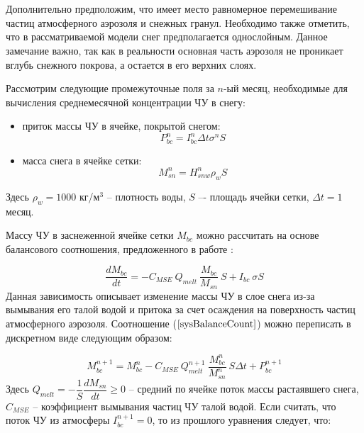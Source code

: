 \documentclass[a4paper, fontsize=14pt]{scrartcl}
\begin{document}
\\~

Дополнительно предположим, что имеет место равномерное перемешивание частиц атмосферного аэрозоля и снежных гранул. Необходимо также отметить, что в рассматриваемой модели снег предполагается однослойным. Данное замечание важно, так как в реальности основная часть аэрозоля не проникает вглубь снежного покрова, а остается в его верхних слоях.

\newpage
Рассмотрим следующие промежуточные поля за $n$-ый месяц, необходимые для вычисления среднемесячной концентрации ЧУ в снегу: 
\begin{itemize}
    \item приток массы ЧУ в ячейке, покрытой снегом:
    \begin{equation}
        P_{bc}^n = I_{bc}^n \Delta t \sigma^n S   \label{sys}
    \end{equation}
    \item масса снега в ячейке сетки:
    \begin{equation}
        M_{sn}^n = H_{snw}^n \rho_w S   \label{sys}
    \end{equation}
\end{itemize} 
Здесь $\rho_w = 1000$ кг/м$^3$ -- плотность воды, $S$ –- площадь ячейки сетки, $\Delta t = 1$ месяц.
    
Массу ЧУ в заснеженной ячейке сетки $M_{bc}$ можно рассчитать на основе балансового соотношения, предложенного в работе \cite{Flanner2007}:

\begin{equation}
    \dfrac{d M_{bc}}{d t} = - C_{MSE} ~ Q_{melt} ~ \dfrac{M_{bc}}{M_{sn}} ~ S + I_{bc} ~ \sigma S     \label{sysBalanceCount}
\end{equation}
Данная зависимость описывает изменение массы ЧУ в слое снега из-за вымывания его талой водой и притока за счет осаждения на поверхность частиц атмосферного аэрозоля. Соотношение ($\ref{sysBalanceCount}$) можно переписать в дискретном виде следующим образом:

\begin{equation}
   M_{bc}^{n+1} = M_{bc}^n - C_{MSE} ~ Q_{melt}^{n+1} ~ \dfrac{M_{bc}^n}{M_{sn}^n} ~ S \Delta t + P_{bc}^{n+1}     \label{sysBalance}
\end{equation}
Здесь $Q_{melt} = - \dfrac{1}{S} \dfrac{dM_{sn}}{dt} \geq 0$ --  средний по ячейке поток массы растаявшего снега, $C_{MSE}$ -- коэффициент вымывания частиц ЧУ талой водой. Если считать, что поток ЧУ из атмосферы $I_{bc}^{n + 1} = 0$, то из прошлого уравнения следует, что:
\end{document}
